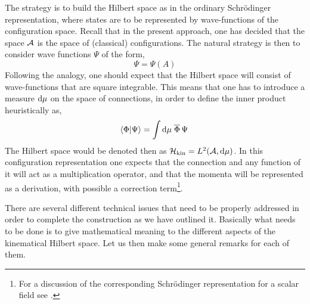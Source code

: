 \documentclass[aps,prd,tightenlines,showpacs,nofootinbib,preprint]{revtex4}
\def\be{\begin{equation}}
\def\ee{\end{equation}}
\def\d{{\rm d}}
\begin{document}
The strategy is to build the Hilbert space as in the ordinary
Schr\"odinger representation, where states are to be represented
by wave-functions of the configuration space. Recall that in the
present approach, one has decided that the space ${\cal A}$ is the
space of (classical) configurations. The natural strategy is then
to consider wave functions $\Psi$ of the form, \be \Psi=\Psi(A)
\ee Following the analogy, one should expect that the Hilbert
space will consist of wave-functions that are square integrable.
This means that one has to introduce a measure $\d\mu$ on the
space of connections, in order to define the inner product
heuristically as,
%
\be \langle\Phi|\Psi\rangle=\int\d\mu\;\overline{\Phi}\,\Psi\, \ee
%
The Hilbert space would be denoted then as $\H_{\rm kin}=L^2({\cal
A},\d\mu)$. In this configuration representation one expects that
the connection and any function of it will act as a multiplication
operator, and that the momenta will be represented as a
derivation, with possible a correction term\footnote{For a
discussion of the corresponding Schr\"odinger representation for a
scalar field see \cite{CCQ}.}.


There are several different technical issues that need to be
properly addressed in order to complete the construction as we
have outlined it. Basically what needs to be done is to give
mathematical meaning to the different aspects of the kinematical
Hilbert space. Let us then make some general remarks for each of
them.
\end{document}
